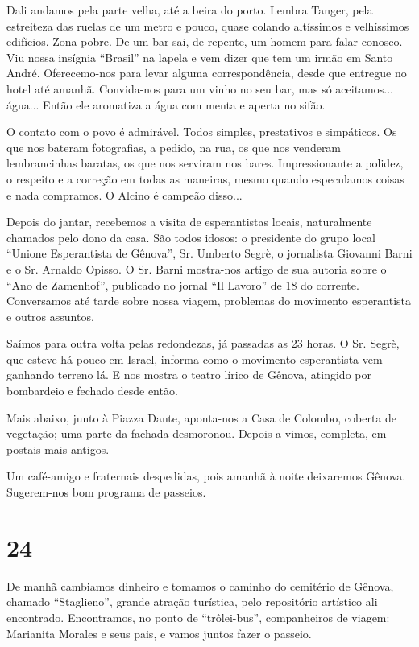 Dali andamos pela parte velha, até a beira do porto. Lembra Tanger, pela estreiteza das ruelas de um metro e pouco, quase colando altíssimos e velhíssimos edifícios. Zona pobre. De um bar sai, de repente, um homem para falar conosco. Viu nossa insígnia ``Brasil'' na lapela e vem dizer que tem um irmão em Santo André. Oferecemo-nos para levar alguma correspondência, desde que entregue no hotel até amanhã. Convida-nos para um vinho no seu bar, mas só aceitamos... água... Então ele aromatiza a água com menta e aperta no sifão.

O contato com o povo é admirável. Todos simples, prestativos e simpáticos. Os que nos bateram fotografias, a pedido, na rua, os que nos venderam lembrancinhas baratas, os que nos serviram nos bares. Impressionante a polidez, o respeito e a correção em todas as maneiras, mesmo quando especulamos coisas e nada compramos. O Alcino é campeão disso...

Depois do jantar, recebemos a visita de esperantistas locais, naturalmente chamados pelo dono da casa. São todos idosos: o presidente do grupo local ``Unione Esperantista de Gênova'', Sr. Umberto Segrè, o jornalista Giovanni Barni e o Sr. Arnaldo Opisso. O Sr. Barni mostra-nos artigo de sua autoria sobre o ``Ano de Zamenhof'', publicado no jornal ``Il Lavoro'' de 18 do corrente. Conversamos até tarde sobre nossa viagem, problemas do movimento esperantista e outros assuntos.

Saímos para outra volta pelas redondezas, já passadas as 23 horas. O Sr. Segrè, que esteve há pouco em Israel, informa como o movimento esperantista vem ganhando terreno lá. E nos mostra o teatro lírico de Gênova, atingido por bombardeio e fechado desde então.

Mais abaixo, junto à Piazza Dante, aponta-nos a Casa de Colombo, coberta de vegetação; uma parte da fachada desmoronou. Depois a vimos, completa, em postais mais antigos.

Um café-amigo e fraternais despedidas, pois amanhã à noite deixaremos Gênova. Sugerem-nos bom programa de passeios.

\section*{24 \adfflatleafright {}}
De manhã cambiamos dinheiro e tomamos o caminho do cemitério de Gênova, chamado ``Staglieno'', grande atração turística, pelo repositório artístico ali encontrado. Encontramos, no ponto de ``trôlei-bus'', companheiros de viagem: Marianita Morales e seus pais, e vamos juntos fazer o passeio.

